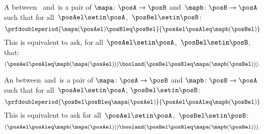 \begin{ctdefinition}\label{def:monotone-galois-connection}
    A  between ~\posA and~\posB is a pair of 
    $\mapa\colon \posA\to \posB$ and~$\mapb\colon \posB\to \posA$ such that for all~$\posAel\setin \posA$,~$\posBel\setin \posB$:
    \begin{equation}
        \prfdoubleperiod{\mapa(\posAel) \posBleq \posBel}{\posAel \posAleq \mapb(\posBel)}
    \end{equation}
    This is equivalent to ask, for all~$\posAel\setin \posA$,~$\posBel\setin \posB$, that:
    \begin{equation}
        (\posAel\posAleq \mapb(\mapa(\posAel)))
        \booland (\posBel\posBleq \mapa(\mapb(\posBel))).
    \end{equation}
\end{ctdefinition}

\begin{ctdefinition}\label{def:antitone-galois-connection}
    An  between~\posA and~\posB is a pair of  $\mapa\colon \posA\to \posB$ and $\mapb \colon \posB\to \posA$ such that for all~$\posAel\setin \posA$, $\posBel\setin \posB$:
    \begin{equation}
        \prfdoubleperiod{\posBel \posBleq \mapa(\posAel)}{\posAel \posAleq \mapb(\posBel)}
    \end{equation}
    This is equivalent to ask for all~$\posAel\setin \posA$,~$\posBel\setin \posB$:
    \begin{equation}
        (\posAel \posAleq \mapb(\mapa(\posAel)))
        \booland (\posBel \posBleq \mapa(\mapb(\posBel))).
    \end{equation}
\end{ctdefinition}


